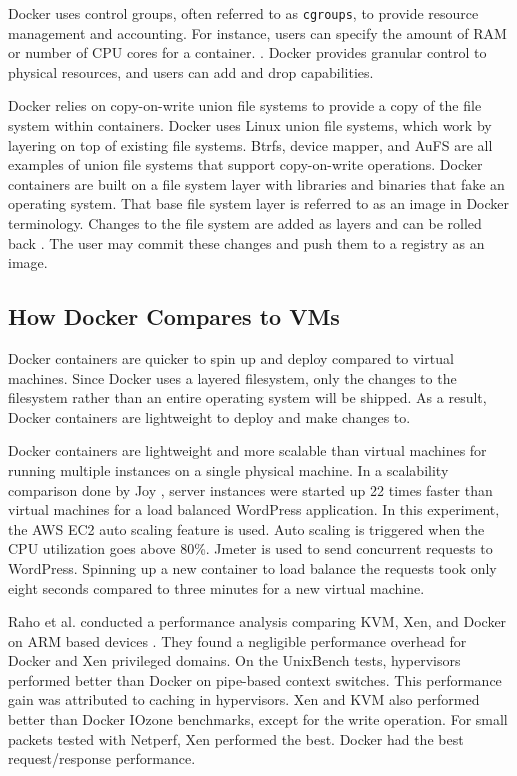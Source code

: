\documentclass[11pt]{article}
\begin{document}
	Docker uses control groups, often referred to as \texttt{cgroups}, to provide resource management and accounting. For instance, users can specify the amount of RAM or number of CPU cores for a container. \cite{anderson}. Docker provides granular control to physical resources, and users can add and drop capabilities.
	
	Docker relies on copy-on-write union file systems to provide a copy of the file system within containers. Docker uses Linux union file systems, which work by layering on top of existing file systems. Btrfs, device mapper, and AuFS are all examples of union file systems that support copy-on-write operations. Docker containers are built on a file system layer with libraries and binaries that fake an operating system. That base file system layer is referred to as an image in Docker terminology. Changes to the file system are added as layers and can be rolled back \cite{anderson}. The user may commit these changes and push them to a registry as an image.
	
	
	\subsection{How Docker Compares to VMs}
	Docker containers are quicker to spin up and deploy compared to virtual machines. Since Docker uses a layered filesystem, only the changes to the filesystem rather than an entire operating system will be shipped. As a result, Docker containers are lightweight to deploy and make changes to.
	
	Docker containers are lightweight and more scalable than virtual machines for running multiple instances on a single physical machine. In a scalability comparison done by Joy \cite{joy}, server instances were started up 22 times faster than virtual machines for a load balanced WordPress application. In this experiment, the AWS EC2 auto scaling feature is used. Auto scaling is triggered when the CPU utilization goes above 80\%. Jmeter is used to send concurrent requests to WordPress. Spinning up a new container to load balance the requests took only eight seconds compared to three minutes for a new virtual machine.
	
	Raho et al. conducted a performance analysis comparing KVM, Xen, and Docker on ARM based devices \cite{raho}. They found a negligible performance overhead for Docker and Xen privileged domains. On the UnixBench tests, hypervisors performed better than Docker on pipe-based context switches. This performance gain was attributed to caching in hypervisors. Xen and KVM also performed better than Docker IOzone benchmarks, except for the write operation. For small packets tested with Netperf, Xen performed the best. Docker had the best request/response performance.
	
\end{document}

